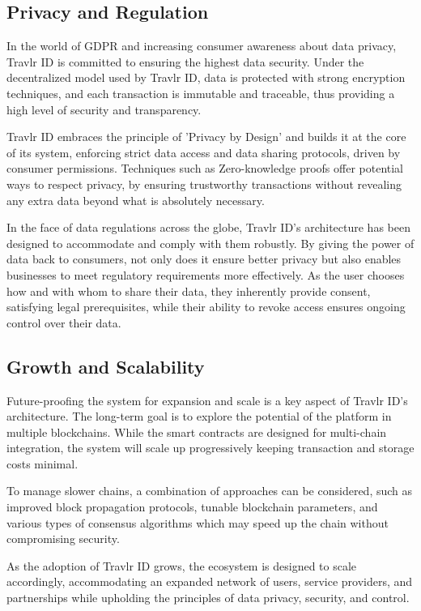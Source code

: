 \documentclass{article}
\begin{document}
\subsection{Privacy and Regulation}

In the world of GDPR and increasing consumer awareness about data privacy, Travlr ID is committed to ensuring the highest data security. Under the decentralized model used by Travlr ID, data is protected with strong encryption techniques, and each transaction is immutable and traceable, thus providing a high level of security and transparency.

Travlr ID embraces the principle of 'Privacy by Design' and builds it at the core of its system, enforcing strict data access and data sharing protocols, driven by consumer permissions. Techniques such as Zero-knowledge proofs offer potential ways to respect privacy, by ensuring trustworthy transactions without revealing any extra data beyond what is absolutely necessary.

In the face of data regulations across the globe, Travlr ID's architecture has been designed to accommodate and comply with them robustly. By giving the power of data back to consumers, not only does it ensure better privacy but also enables businesses to meet regulatory requirements more effectively. As the user chooses how and with whom to share their data, they inherently provide consent, satisfying legal prerequisites, while their ability to revoke access ensures ongoing control over their data.

\subsection{Growth and Scalability}

Future-proofing the system for expansion and scale is a key aspect of Travlr ID's architecture. The long-term goal is to explore the potential of the platform in multiple blockchains. While the smart contracts are designed for multi-chain integration, the system will scale up progressively keeping transaction and storage costs minimal.

To manage slower chains, a combination of approaches can be considered, such as improved block propagation protocols, tunable blockchain parameters, and various types of consensus algorithms which may speed up the chain without compromising security.

As the adoption of Travlr ID grows, the ecosystem is designed to scale accordingly, accommodating an expanded network of users, service providers, and partnerships while upholding the principles of data privacy, security, and control.
\end{document}
